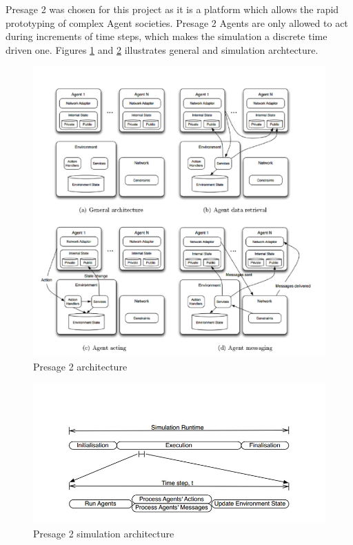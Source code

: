 Presage 2 was chosen for this project as it is a platform which allows the rapid prototyping of complex Agent societies. Presage 2 Agents are only allowed to act during increments of time steps, which makes the simulation a discrete time driven one. Figures \ref{fig:Presage_architecture} and \ref{fig:Presage_sim_architecture} illustrates general and simulation archtecture.

\begin{figure}[h!]
	\centering
	\includegraphics[scale=0.25]{Images/Presage.jpg}
	\caption{Presage 2 architecture \cite{Presage_Kyoto:2015}}
	\label{fig:Presage_architecture}
\end{figure}

\begin{figure}[h!]
	\centering
	\includegraphics[scale=0.4]{Images/Presage2.jpg}
	\caption{Presage 2 simulation architecture \cite{Presage_Kyoto:2015}}
	\label{fig:Presage_sim_architecture}
\end{figure}


